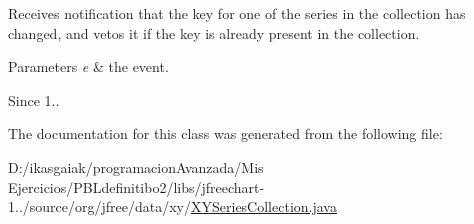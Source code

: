 Receives notification that the key for one of the series in the collection has changed, and vetos it if the key is already present in the collection.


\begin{DoxyParams}{Parameters}
{\em e} & the event.\\
\hline
\end{DoxyParams}
\begin{DoxySince}{Since}
1.. 
\end{DoxySince}


The documentation for this class was generated from the following file\+:\begin{DoxyCompactItemize}
\item 
D\+:/ikasgaiak/programacion\+Avanzada/\+Mis Ejercicios/\+P\+B\+Ldefinitibo2/libs/jfreechart-\/1../source/org/jfree/data/xy/\mbox{\hyperlink{_x_y_series_collection_8java}{X\+Y\+Series\+Collection.\+java}}\end{DoxyCompactItemize}
